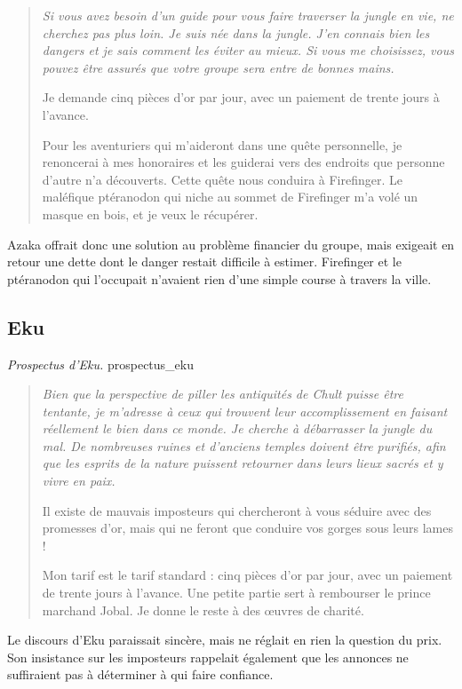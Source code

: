 \begin{quote}\itshape
Si vous avez besoin d'un guide pour vous faire traverser la jungle en vie, ne cherchez pas plus loin. Je suis née dans la jungle. J'en connais bien les dangers et je sais comment les éviter au mieux. Si vous me choisissez, vous pouvez être assurés que votre groupe sera entre de bonnes mains.

Je demande cinq pièces d'or par jour, avec un paiement de trente jours à l'avance.

Pour les aventuriers qui m'aideront dans une quête personnelle, je renoncerai à mes honoraires et les guiderai vers des endroits que personne d'autre n'a découverts. Cette quête nous conduira à Firefinger. Le maléfique ptéranodon qui niche au sommet de Firefinger m'a volé un masque en bois, et je veux le récupérer.
\end{quote}

Azaka offrait donc une solution au problème financier du groupe, mais exigeait en retour une dette dont le danger restait difficile à estimer. Firefinger et le ptéranodon qui l'occupait n'avaient rien d'une simple course à travers la ville.

\subsection*{Eku}

{\textit{Prospectus d'Eku.}}
{prospectus_eku}

\begin{quote}\itshape
Bien que la perspective de piller les antiquités de Chult puisse être tentante, je m'adresse à ceux qui trouvent leur accomplissement en faisant réellement le bien dans ce monde. Je cherche à débarrasser la jungle du mal. De nombreuses ruines et d'anciens temples doivent être purifiés, afin que les esprits de la nature puissent retourner dans leurs lieux sacrés et y vivre en paix.

Il existe de mauvais imposteurs qui chercheront à vous séduire avec des promesses d'or, mais qui ne feront que conduire vos gorges sous leurs lames !

Mon tarif est le tarif standard : cinq pièces d'or par jour, avec un paiement de trente jours à l'avance. Une petite partie sert à rembourser le prince marchand Jobal. Je donne le reste à des œuvres de charité.
\end{quote}

Le discours d'Eku paraissait sincère, mais ne réglait en rien la question du prix. Son insistance sur les imposteurs rappelait également que les annonces ne suffiraient pas à déterminer à qui faire confiance.

